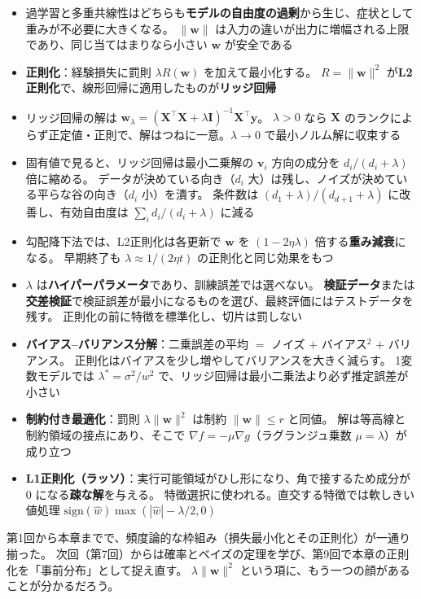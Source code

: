 \begin{itemize}
  \item 過学習と多重共線性はどちらも\textbf{モデルの自由度の過剰}から生じ、症状として重みが不必要に大きくなる。
    $\|\bm{w}\|$ は入力の違いが出力に増幅される上限であり、同じ当てはまりなら小さい $\bm{w}$ が安全である
  \item \textbf{正則化}：経験損失に罰則 $\lambda R(\bm{w})$ を加えて最小化する。
    $R = \|\bm{w}\|^2$ が\textbf{L2正則化}で、線形回帰に適用したものが\textbf{リッジ回帰}
  \item リッジ回帰の解は $\bm{w}_\lambda = (\bm{X}^\top\bm{X} + \lambda\bm{I})^{-1}\bm{X}^\top\bm{y}$。
    $\lambda > 0$ なら $\bm{X}$ のランクによらず正定値・正則で、解はつねに一意。$\lambda \to 0$ で最小ノルム解に収束する
  \item 固有値で見ると、リッジ回帰は最小二乗解の $\bm{v}_i$ 方向の成分を $d_i/(d_i + \lambda)$ 倍に縮める。
    データが決めている向き（$d_i$ 大）は残し、ノイズが決めている平らな谷の向き（$d_i$ 小）を潰す。
    条件数は $(d_1 + \lambda)/(d_{d+1} + \lambda)$ に改善し、有効自由度は $\sum_i d_i/(d_i + \lambda)$ に減る
  \item 勾配降下法では、L2正則化は各更新で $\bm{w}$ を $(1 - 2\eta\lambda)$ 倍する\textbf{重み減衰}になる。
    早期終了も $\lambda \approx 1/(2\eta t)$ の正則化と同じ効果をもつ
  \item $\lambda$ は\textbf{ハイパーパラメータ}であり、訓練誤差では選べない。
    \textbf{検証データ}または\textbf{交差検証}で検証誤差が最小になるものを選び、最終評価にはテストデータを残す。
    正則化の前に特徴を標準化し、切片は罰しない
  \item \textbf{バイアス--バリアンス分解}：二乗誤差の平均 $=$ ノイズ $+$ バイアス$^2$ $+$ バリアンス。
    正則化はバイアスを少し増やしてバリアンスを大きく減らす。
    1変数モデルでは $\lambda^* = \sigma^2/w^2$ で、リッジ回帰は最小二乗法より必ず推定誤差が小さい
  \item \textbf{制約付き最適化}：罰則 $\lambda\|\bm{w}\|^2$ は制約 $\|\bm{w}\| \leq r$ と同値。
    解は等高線と制約領域の接点にあり、そこで $\nabla f = -\mu\nabla g$（ラグランジュ乗数 $\mu = \lambda$）が成り立つ
  \item \textbf{L1正則化（ラッソ）}：実行可能領域がひし形になり、角で接するため成分が $0$ になる\textbf{疎な解}を与える。
    特徴選択に使われる。直交する特徴では軟しきい値処理 $\mathrm{sign}(\hat{w})\max(|\hat{w}| - \lambda/2, 0)$
\end{itemize}

第1回から本章までで、頻度論的な枠組み（損失最小化とその正則化）が一通り揃った。
次回（第7回）からは確率とベイズの定理を学び、第9回で本章の正則化を「事前分布」として捉え直す。
$\lambda\|\bm{w}\|^2$ という項に、もう一つの顔があることが分かるだろう。


